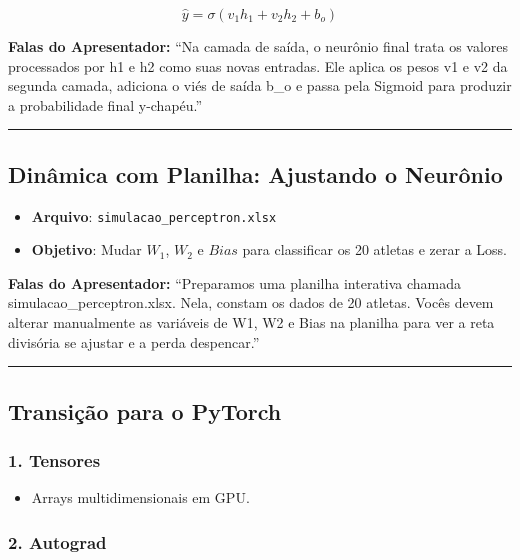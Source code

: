 \documentclass[
  letterpaper,
  DIV=11,
  numbers=noendperiod]{scrartcl}
\providecommand{\tightlist}{%
  \setlength{\itemsep}{0pt}\setlength{\parskip}{0pt}}
\begin{document}
\[\hat{y} = \sigma(v_1 h_1 + v_2 h_2 + b_o)\]

\textbf{Falas do Apresentador:} ``Na camada de saída, o neurônio final
trata os valores processados por h1 e h2 como suas novas entradas. Ele
aplica os pesos v1 e v2 da segunda camada, adiciona o viés de saída b\_o
e passa pela Sigmoid para produzir a probabilidade final y-chapéu.''

\begin{center}\rule{0.5\linewidth}{0.5pt}\end{center}

\subsection{Dinâmica com Planilha: Ajustando o
Neurônio}\label{dinuxe2mica-com-planilha-ajustando-o-neuruxf4nio}

\begin{itemize}
\tightlist
\item
  \textbf{Arquivo}: \texttt{simulacao\_perceptron.xlsx}
\item
  \textbf{Objetivo}: Mudar \(W_1\), \(W_2\) e \(Bias\) para classificar
  os 20 atletas e zerar a Loss.
\end{itemize}

\textbf{Falas do Apresentador:} ``Preparamos uma planilha interativa
chamada simulacao\_perceptron.xlsx. Nela, constam os dados de 20
atletas. Vocês devem alterar manualmente as variáveis de W1, W2 e Bias
na planilha para ver a reta divisória se ajustar e a perda despencar.''

\begin{center}\rule{0.5\linewidth}{0.5pt}\end{center}

\subsection{Transição para o
PyTorch}\label{transiuxe7uxe3o-para-o-pytorch}

\subsubsection{1. Tensores}\label{tensores}

\begin{itemize}
\tightlist
\item
  Arrays multidimensionais em GPU.
\end{itemize}

\subsubsection{2. Autograd}\label{autograd}
\end{document}
